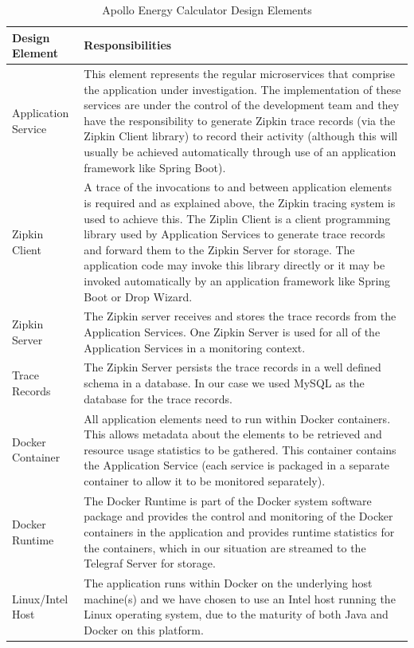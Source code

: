 \begin{table}
\centering
\caption{Apollo Energy Calculator Design Elements}
\label{table:designelements}
\footnotesize
\begin{tabular}{|l|p{10cm}|}
\hline
\textbf{Design Element} & \textbf{Responsibilities}  \\
\hline
\hline
Application Service & This element represents the regular microservices that comprise the application under investigation.  The implementation of these services are under the control of the development team and they have the responsibility to generate Zipkin trace records (via the Zipkin Client library) to record their activity (although this will usually be achieved automatically through use of an application framework like Spring Boot). \\
\hline
Zipkin Client & A trace of the invocations to and between application elements is required and as explained above, the Zipkin tracing system is used to achieve this.  The Ziplin Client is a client programming library used by Application Services to generate trace records and forward them to the Zipkin Server for storage.  The application code may invoke this library directly or it may be invoked automatically by an application framework like Spring Boot or Drop Wizard. \\
\hline
Zipkin Server & The Zipkin server receives and stores the trace records from the Application Services.  One Zipkin Server is used for all of the Application Services in a monitoring context. \\
\hline
Trace Records & The Zipkin Server persists the trace records in a well defined schema in a database.  In our case we used MySQL as the database for the trace records. \\
\hline
Docker Container    & All application elements need to run within Docker containers.  This allows metadata about the elements to be retrieved and resource usage statistics to be gathered.  This container contains the Application Service (each service is packaged in a separate container to allow it to be monitored separately).\\
\hline
Docker Runtime     & The Docker Runtime is part of the Docker system software package and provides the control and monitoring of the Docker containers in the application and provides runtime statistics for the containers, which in our situation are streamed to the Telegraf Server for storage. \\
\hline
Linux/Intel Host   & The application runs within Docker on the underlying host machine(s) and we have chosen to use an Intel host running the Linux operating system, due to the maturity of both Java and Docker on this platform. \\

\end{tabular}
\end{table}
